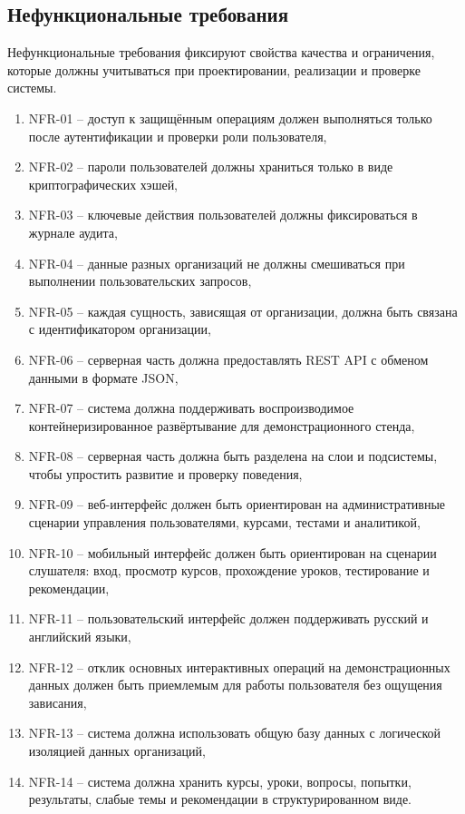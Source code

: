 \subsection{Нефункциональные требования}

Нефункциональные требования фиксируют свойства качества и ограничения, которые должны учитываться при проектировании, реализации и проверке системы.
\begin{enumerate}
  \item NFR-01 -- доступ к защищённым операциям должен выполняться только после аутентификации и проверки роли пользователя,
  \item NFR-02 -- пароли пользователей должны храниться только в виде криптографических хэшей,
  \item NFR-03 -- ключевые действия пользователей должны фиксироваться в журнале аудита,
  \item NFR-04 -- данные разных организаций не должны смешиваться при выполнении пользовательских запросов,
  \item NFR-05 -- каждая сущность, зависящая от организации, должна быть связана с идентификатором организации,
  \item NFR-06 -- серверная часть должна предоставлять REST API с обменом данными в формате JSON,
  \item NFR-07 -- система должна поддерживать воспроизводимое контейнеризированное развёртывание для демонстрационного стенда,
  \item NFR-08 -- серверная часть должна быть разделена на слои и подсистемы, чтобы упростить развитие и проверку поведения,
  \item NFR-09 -- веб-интерфейс должен быть ориентирован на административные сценарии управления пользователями, курсами, тестами и аналитикой,
  \item NFR-10 -- мобильный интерфейс должен быть ориентирован на сценарии слушателя: вход, просмотр курсов, прохождение уроков, тестирование и рекомендации,
  \item NFR-11 -- пользовательский интерфейс должен поддерживать русский и английский языки,
  \item NFR-12 -- отклик основных интерактивных операций на демонстрационных данных должен быть приемлемым для работы пользователя без ощущения зависания,
  \item NFR-13 -- система должна использовать общую базу данных с логической изоляцией данных организаций,
  \item NFR-14 -- система должна хранить курсы, уроки, вопросы, попытки, результаты, слабые темы и рекомендации в структурированном виде.
\end{enumerate}

